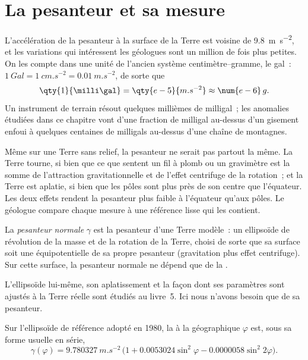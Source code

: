 \section{La pesanteur et sa mesure}

L'accélération de la pesanteur à la surface de la Terre est voisine de
\qty{9.8}{m.s^{-2}}, et les variations qui intéressent les géologues sont un
million de fois plus petites. On les compte dans une unité de l'ancien système
centimètre--gramme, le gal~: $\qty{1}{Gal} = \qty{1}{cm.s^{-2}} = \qty{0.01}{m.s^{-2}}$, de sorte
que
\[
  \qty{1}{\milli\gal} = \qty{e-5}{m.s^{-2}} \approx \num{e-6}\,g .
\]
Un instrument de terrain résout quelques millièmes de milligal~; les anomalies
étudiées dans ce chapitre vont d'une fraction de milligal au-dessus d'un
gisement enfoui à quelques centaines de milligals au-dessus d'une chaîne de
montagnes.

Même sur une Terre sans relief, la pesanteur ne serait pas partout la même. La
Terre tourne, si bien que ce que sentent un fil à plomb ou un gravimètre est la
somme de l'attraction gravitationnelle et de l'effet centrifuge de la rotation~;
et la Terre est aplatie, si bien que les pôles sont plus près de son centre que
l'équateur. Les deux effets rendent la pesanteur plus faible à l'équateur qu'aux
pôles. Le géologue compare chaque mesure à une référence lisse qui les contient.

\begin{definition}\label{def:b1:isostasy-gravity:normal-gravity}
La \emph{pesanteur normale} $\gamma$ est la pesanteur d'une
Terre modèle~: un ellipsoïde de révolution de la masse et de la rotation de la Terre,
choisi de sorte que sa surface soit une équipotentielle de sa propre pesanteur
(gravitation plus effet centrifuge). Sur cette surface, la pesanteur normale ne
dépend que de la .
\end{definition}

L'ellipsoïde lui-même, son aplatissement et la façon dont ses paramètres sont
ajustés à la Terre réelle sont étudiés au livre~5. Ici nous n'avons besoin que de
sa pesanteur.

\begin{proposition}\label{prop:b1:isostasy-gravity:normal-formula}
Sur l'ellipsoïde de référence adopté en 1980, la  à la 
géographique $\varphi$ est, sous sa forme usuelle en série,
\[
  \gamma(\varphi) = \qty{9.780327}{m.s^{-2}}\,\bigl(1 + 0.0053024\sin^2\varphi
  - 0.0000058\sin^2 2\varphi\bigr).
\]
\end{proposition}
\admitted

